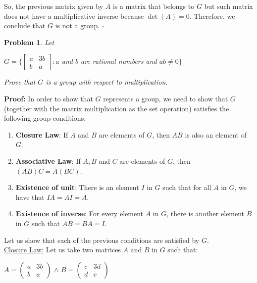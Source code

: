 \documentclass[a4paper,openany,11pt]{book}
\newtheorem{Prob}{Problem}
\begin{document}
So, the previous matrix given by $A$ is a matrix that belongs to $G$ but such matrix does not have a multiplicative inverse because $\det(A) = 0$. Therefore, we conclude that $G$ is not a group. \hspace{0.1cm} $\square$

\begin{Prob}
	Let
	
	\begin{center}
		$G = \biggl\{\left[\begin{array}{cc}
		a & 3b\\
		b & a
		\end{array}\right] : a$ and $b$ are rational numbers and $ab \neq 0\biggr\} $
	\end{center}
	
	Prove that $G$ is a group with respect to multiplication.
\end{Prob}

\textbf{Proof:} In order to show that $G$ represents a group, we need to show that $G$ (together with the matrix multiplication as the set operation) satisfies the following group conditions:

\begin{enumerate}
	\item \textbf{Closure Law}: If $A$ and $B$ are elements of $G$, then $AB$ is also an element of $G$. 
	
	\item \textbf{Associative Law}: If $A, B$ and $C$ are elements of $G$, then $(AB)C = A(BC)$.
	
	\item \textbf{Existence of unit}: There is an element $I$ in $G$ such that for all $A$ in $G$, we have that $IA = AI = A$.
	
	\item \textbf{Existence of inverse}: For every element $A$ in $G$, there is another element $B$ in $G$ such that $AB = BA = I$.
\end{enumerate}

Let us show that each of the previous conditions are satisfied by $G$.\\

\underline{Closure Law:} Let us take two matrices $A$ and $B$ in $G$ such that:

\begin{center}
	$A = \left(\begin{array}{cc}
	a & 3b\\
	b & a
	\end{array}\right)$ \hspace{0.1cm} $\wedge$ \hspace{0.1cm} $B = \left(\begin{array}{cc}
		c & 3d\\
		d & c
	\end{array}\right)$
\end{center}
\end{document}
